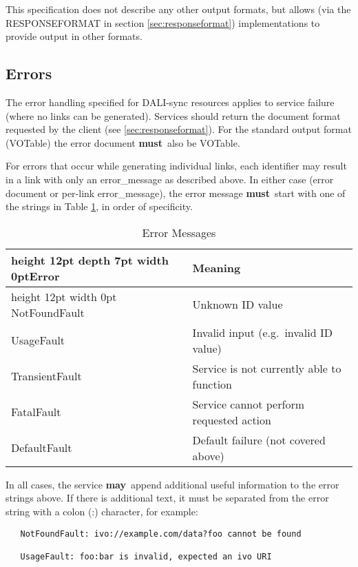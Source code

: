 \documentclass[11pt,a4paper]{ivoa}
\newcommand{\rfcmust}{\textbf{must}}
\newcommand{\rfcmay}{\textbf{may}}
\begin{document}
This specification does not describe any other output formats, but allows
(via the RESPONSEFORMAT in section \ref{sec:responseformat})
implementations to provide
output in other formats.


\subsection{Errors}

The error handling specified for DALI-sync resources applies
to service failure (where no links can be generated).
Services should return the
document format requested by the client (see \ref{sec:responseformat}).
For the standard
output format (VOTable) the error document \rfcmust\ also be VOTable.

For errors that occur while generating individual links, each
identifier may result in a link with only an error\_message
as described above.
In either case (error document or per-link error\_message),
the error message \rfcmust\ start with one of the strings in
Table \ref{tab:errors}, in order of specificity.
\begin{table}[ht]
\begin{center}
\begin{tabular}{|l|l|}
\hline
\vrule height 12pt depth 7pt width 0pt{\bf Error} & {\bf Meaning} \\
\hline
\vrule height 12pt width 0pt  NotFoundFault  & Unknown ID value    \\
UsageFault     & Invalid input (e.g.\ invalid ID value) \\
TransientFault & Service is not currently able to function \\
FatalFault     & Service cannot perform requested action \\
DefaultFault   & Default failure (not covered above) \\
\hline
\end{tabular}
\end{center}
\caption{Error Messages}
\label{tab:errors}
\end{table}

In all cases, the service \rfcmay\ append additional useful information to the
error strings above.
If there is additional text, it must be separated
from the error string with a colon (:) character, for example:
\begin{verbatim}
   NotFoundFault: ivo://example.com/data?foo cannot be found

   UsageFault: foo:bar is invalid, expected an ivo URI
\end{verbatim}
\end{document}
